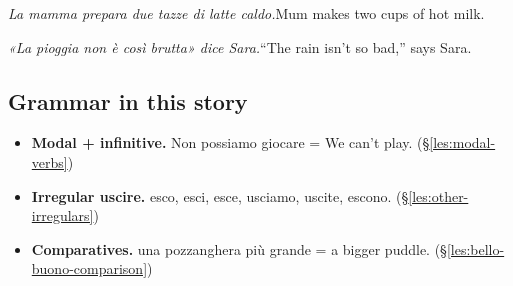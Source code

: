 \documentclass[11pt,a4paper,twoside,openright]{book}
\begin{document}
\begin{sentences}
\item\relax \textit{La mamma prepara due tazze di latte caldo.}\newline Mum makes two cups of hot milk.
\item\relax \textit{«La pioggia non è così brutta» dice Sara.}\newline “The rain isn't so bad,” says Sara.
\end{sentences}
\subsection*{Grammar in this story}
\begin{itemize}
\item\relax \textbf{Modal + infinitive.} Non possiamo giocare = We can't play. (\S\ref{les:modal-verbs})
\item\relax \textbf{Irregular uscire.} esco, esci, esce, usciamo, uscite, escono. (\S\ref{les:other-irregulars})
\item\relax \textbf{Comparatives.} una pozzanghera più grande = a bigger puddle. (\S\ref{les:bello-buono-comparison})
\end{itemize}
\end{document}
